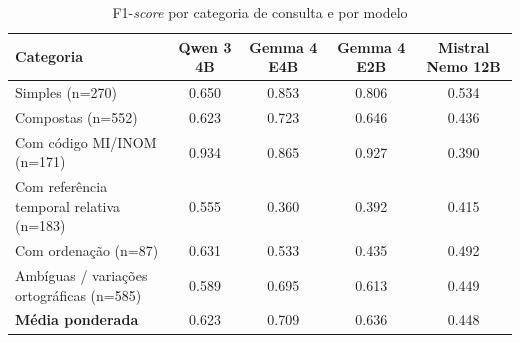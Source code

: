 \begin{table}[htbp!]
\centering
\caption{F1-\textit{score} por categoria de consulta e por modelo}
\label{tab:resultados_por_categoria}
\small
\begin{tabular}{|l|c|c|c|c|}
\hline
\textbf{Categoria} & \textbf{Qwen 3 4B} & \textbf{Gemma 4 E4B} & \textbf{Gemma 4 E2B} & \textbf{Mistral Nemo 12B} \\
\hline
Simples (n=270) & 0.650 & 0.853 & 0.806 & 0.534 \\
Compostas (n=552) & 0.623 & 0.723 & 0.646 & 0.436 \\
Com código MI/INOM (n=171) & 0.934 & 0.865 & 0.927 & 0.390 \\
Com referência temporal relativa (n=183) & 0.555 & 0.360 & 0.392 & 0.415 \\
Com ordenação (n=87) & 0.631 & 0.533 & 0.435 & 0.492 \\
Ambíguas / variações ortográficas (n=585) & 0.589 & 0.695 & 0.613 & 0.449 \\
\hline
\textbf{Média ponderada} & 0.623 & 0.709 & 0.636 & 0.448 \\
\hline
\end{tabular}
\end{table}
